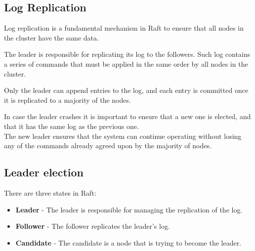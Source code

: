 \subsection{Log Replication}
Log replication is a fundamental mechanism in Raft to ensure that all nodes in the cluster have the same data.

The leader is responsible for replicating its log to the followers. Such log contains a series of commands that must be applied in the same order by all nodes in the cluster.

Only the leader can append entries to the log, and each entry is committed once it is replicated to a majority of the nodes.
\nl

In case the leader crashes it is important to ensure that a new one is elected, and that it has the same log as the previous one.\\
The new leader ensures that the system can continue operating without losing any of the commands already agreed upon by the majority of nodes.


\subsection{Leader election}
There are three states in Raft:
\begin{itemize}
   \item \textbf{Leader} - The leader is responsible for managing the replication of the log.
   \item \textbf{Follower} - The follower replicates the leader's log.
   \item \textbf{Candidate} - The candidate is a node that is trying to become the leader.
\end{itemize}


